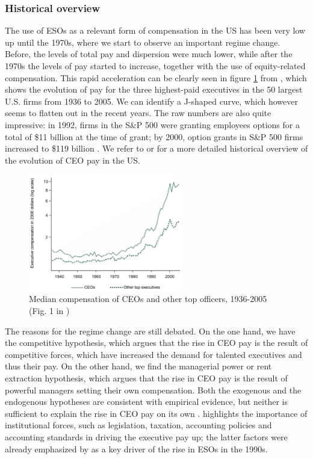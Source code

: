 \subsubsection{Historical overview}
The use of ESOs as a relevant form of compensation in the US has been very low up until the 1970s, where we start to observe an important regime change. Before, the levels of total pay and dispersion were much lower, while after the 1970s the levels of pay started to increase, together with the use of equity-related compensation.
This rapid acceleration can be clearly seen in figure \ref*{fig:frydman_fig1} from \citet{frydman2010ceo}, which shows the evolution of pay for the three highest-paid executives in the 50 largest U.S. firms from 1936 to 2005. We can identify a J-shaped curve, which however seems to flatten out in the recent years. The raw numbers are also quite impressive: in 1992, firms in the S\&P 500 were granting employees options for a total of \$11 billion at the time of grant; by 2000, option grants in S\&P 500 firms increased to \$119 billion \citep{hall2003trouble}. We refer to \citet{frydman2010ceo} or \citet{edmans2017executive} for a more detailed historical overview of the evolution of CEO pay in the US. 

\vspace*{15pt}
\begin{figure}[H]
    \centering
    \includegraphics[width=0.6\textwidth]{fig/2/Frydman_fig1.png}
    \caption{Median compensation of CEOs and other top officers, 1936-2005 (Fig. 1 in \citet{frydman2010ceo})}
    \label{fig:frydman_fig1}
\end{figure}
\vspace*{15pt}


The reasons for the regime change are still debated. On the one hand, we have the competitive hypothesis, which argues that the rise in CEO pay is the result of competitive forces, which have increased the demand for talented executives and thus their pay. On the other hand, we find the managerial power or rent extraction hypothesis, which argues that the rise in CEO pay is the result of powerful managers setting their own compensation. Both the exogenous and the endogenous hypotheses are consistent with empirical evidence, but neither is sufficient to explain the rise in CEO pay on its own \citep{frydman2010ceo}. \citet{edmans2017executive} highlights the importance of institutional forces, such as legislation, taxation, accounting policies and accounting standards in driving the executive pay up; the latter factors were already emphasized by \citet{hall2003trouble} as a key driver of the rise in ESOs in the 1990s. 


